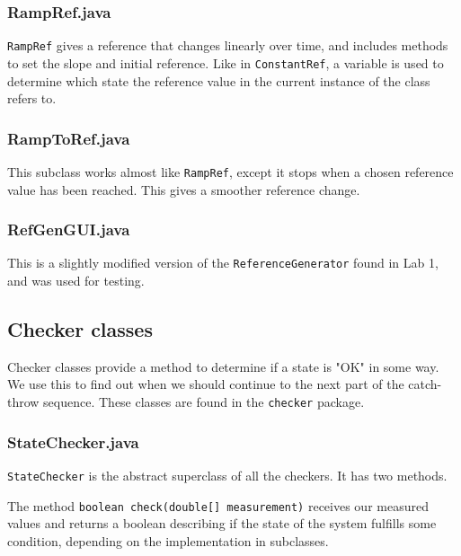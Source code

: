 \subsubsection{RampRef.java}
\texttt{RampRef} gives a reference that changes linearly over time, and includes methods to set the slope and initial reference. Like in \texttt{ConstantRef}, a variable is used to determine which state the reference value in the current instance of the class refers to.

\subsubsection{RampToRef.java}
This subclass works almost like \texttt{RampRef}, except it stops when a chosen reference value has been reached. This gives a smoother reference change.

\subsubsection{RefGenGUI.java}
This is a slightly modified version of the \texttt{ReferenceGenerator} found in Lab 1, and was used for testing.








\subsection{Checker classes}\label{Checkers}
Checker classes provide a method to determine if a state is "OK" in some way. We use this to find out when we should continue to the next part of the catch-throw sequence. These classes are found in the \texttt{checker} package.
\subsubsection{StateChecker.java}
\texttt{StateChecker} is the abstract superclass of all the checkers. It has two methods.

The method \texttt{boolean check(double[] measurement)} receives our measured values and returns a boolean describing if the state of the system fulfills some condition, depending on the implementation in subclasses.

